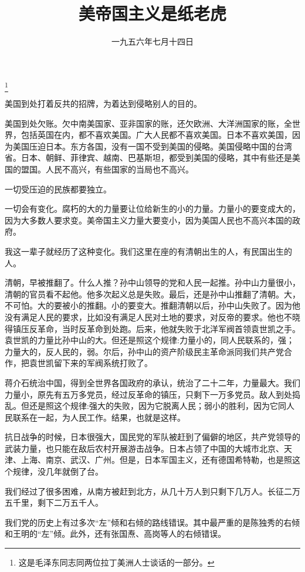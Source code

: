 
\title{美帝国主义是纸老虎}
\date{一九五六年七月十四日}
\thanks{这是毛泽东同志同两位拉丁美洲人士谈话的一部分。}
\maketitle


美国到处打着反共的招牌，为着达到侵略别人的目的。

美国到处欠账。欠中南美国家、亚非国家的账，还欠欧洲、大洋洲国家的账，全世界，包括英国在内，都不喜欢美国。广大人民都不喜欢美国。日本不喜欢美国，因为美国压迫日本。东方各国，没有一国不受到美国的侵略。美国侵略中国的台湾省。日本、朝鲜、菲律宾、越南、巴基斯坦，都受到美国的侵略，其中有些还是美国的盟国。人民不高兴，有些国家的当局也不高兴。

一切受压迫的民族都要独立。

一切会有变化。腐朽的大的力量要让位给新生的小的力量。力量小的要变成大的，因为大多数人要求变。美帝国主义力量大要变小，因为美国人民也不高兴本国的政府。

我这一辈子就经历了这种变化。我们这里在座的有清朝出生的人，有民国出生的人。

清朝，早被推翻了。什么人推？孙中山领导的党和人民一起推。孙中山力量很小，清朝的官员看不起他。他多次起义总是失败。最后，还是孙中山推翻了清朝。大，不可怕。大的要被小的推翻。小的要变大。推翻清朝以后，孙中山失败了。因为他没有满足人民的要求，比如没有满足人民对土地的要求，对反帝的要求。他也不晓得镇压反革命，当时反革命到处跑。后来，他就失败于北洋军阀首领袁世凯之手。袁世凯的力量比孙中山的大。但还是照这个规律:力量小的，同人民联系的，强；力量大的，反人民的，弱。尔后，孙中山的资产阶级民主革命派同我们共产党合作，把袁世凯留下来的军阀系统打败了。

蒋介石统治中国，得到全世界各国政府的承认，统治了二十二年，力量最大。我们力量小，原先有五万多党员，经过反革命的镇压，只剩下一万多党员。敌人到处捣乱。但还是照这个规律:强大的失败，因为它脱离人民；弱小的胜利，因为它同人民联系在一起，为人民工作。结果，也就是这样。

抗日战争的时候，日本很强大，国民党的军队被赶到了偏僻的地区，共产党领导的武装力量，也只能在敌后农村开展游击战争。日本占领了中国的大城市北京、天津、上海、南京、武汉、广州。但是，日本军国主义，还有德国希特勒，也是照这个规律，没几年就倒了台。

我们经过了很多困难，从南方被赶到北方，从几十万人到只剩下几万人。长征二万五千里，剩下二万五千人。

我们党的历史上有过多次“左”倾和右倾的路线错误。其中最严重的是陈独秀的右倾和王明的“左”倾。此外，还有张国焘、高岗等人的右倾错误。

